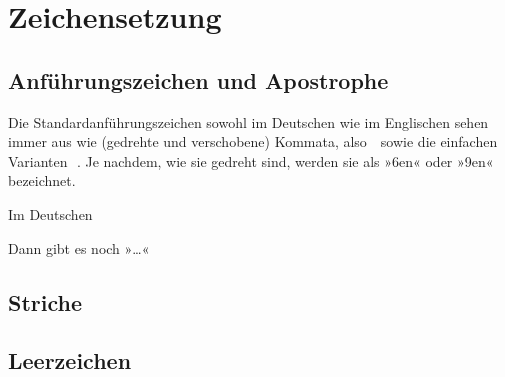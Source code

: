 \chapter{Zeichensetzung}

\lipsum[1]

\section{Anführungszeichen und Apostrophe}

Die Standardanführungszeichen sowohl im Deutschen wie im Englischen sehen immer
aus wie (gedrehte und verschobene) Kommata, also \,\,
sowie die einfachen Varianten \,\,. Je nachdem, wie sie
gedreht sind, werden sie als »6en« oder »9en« bezeichnet.

Im Deutschen 

Dann gibt es noch »…«

\section{Striche}

\section{Leerzeichen}

